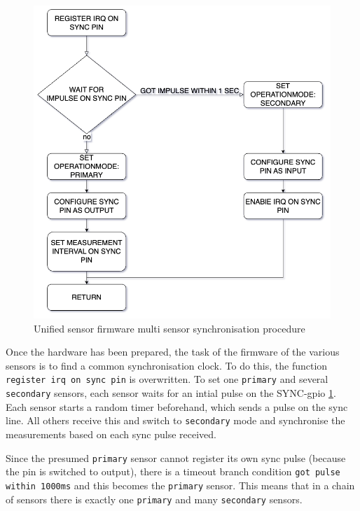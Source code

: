 \begin{figure}
\centering
\includegraphics{./generated_images/border_Unified_sensor_firmware_multi_sensor_synchronisation_procedure.png}
\caption{Unified sensor firmware multi sensor synchronisation procedure
\label{Unified_sensor_firmware_multi_sensor_synchronisation_procedure.png}}
\end{figure}

Once the hardware has been prepared, the task of the firmware of the
various sensors is to find a common synchronisation clock. To do this,
the function \passthrough{\lstinline!register irq on sync pin!} is
overwritten. To set one \passthrough{\lstinline!primary!} and several
\passthrough{\lstinline!secondary!} sensors, each sensor waits for an
intial pulse on the SYNC-\gls{gpio}
\ref{Unified_sensor_firmware_multi_sensor_synchronisation_procedure.png}.
Each sensor starts a random timer beforehand, which sends a pulse on the
sync line. All others receive this and switch to
\passthrough{\lstinline!secondary!} mode and synchronise the
measurements based on each sync pulse received.

Since the presumed \passthrough{\lstinline!primary!} sensor cannot
register its own sync pulse (because the pin is switched to output),
there is a timeout branch condition
\passthrough{\lstinline!got pulse within 1000ms!} and this becomes the
\passthrough{\lstinline!primary!} sensor. This means that in a chain of
sensors there is exactly one \passthrough{\lstinline!primary!} and many
\passthrough{\lstinline!secondary!} sensors.


